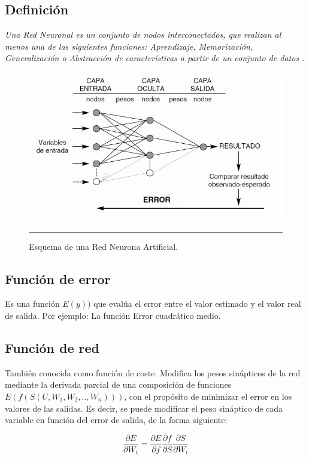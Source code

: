 \documentclass[11pt,titlepage]{report}
\begin{document}
\subsection{Definición}
\textit{Una Red Neuronal es un conjunto de nodos interconectados, que realizan al menos una de las siguientes funciones: Aprendizaje, Memorización, Generalización o Abstracción de características a partir de un conjunto de datos \cite{Lib03}.} 
\begin{figure}[h]
	\centering
	\includegraphics[scale=0.8]{Pic/04-RA}
	\caption{Esquema de una Red Neurona Artificial.\cite{Lib12}}
	\label{01}
	\hrule
\end{figure}

\subsection{Función de error} 
Es una función $E(y))$ que evalúa el error entre el valor estimado y el valor real de salida. Por ejemplo: La función Error cuadrático medio.

\subsection{Función de red}
También conocida como función de coste. Modifica los pesos sinápticos de la red mediante la derivada parcial de una composición de funciones $E(f(S(U, W_1, W_2, .., W_n)))$, con el propósito de minimizar el error en los valores de las salidas. Es decir, se puede modificar el peso sináptico de cada variable en función del error de salida, de la forma siguiente:

\[\dfrac{ \partial E}{\partial W_i} = \dfrac{ \partial E}{\partial f}\dfrac{ \partial f}{\partial S}\dfrac{ \partial S}{\partial W_i} \]
\end{document}
